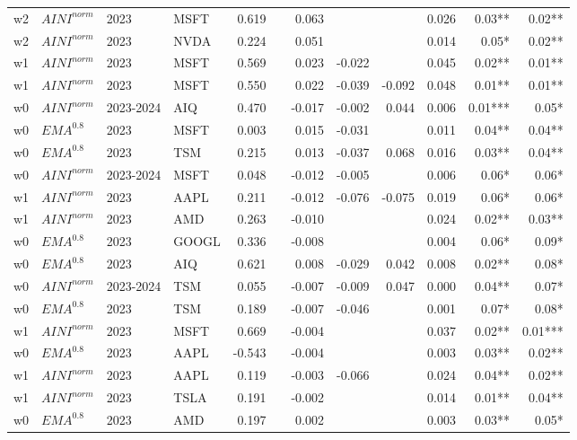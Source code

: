 {\begin{tabularx}{\textwidth}{@{}X@{\hspace{0.5pt}}X@{\hspace{0.5pt}}X@{\hspace{0.5pt}}X@{\hspace{2.0pt}} r r r r r r r r@{}}
w2 & $AINI^{norm}$ & 2023 & MSFT & 0.619 &  & 0.063 &  &  & 0.026 & 0.03** & 0.02** \\
w2 & $AINI^{norm}$ & 2023 & NVDA & 0.224 &  & 0.051 &  &  & 0.014 & 0.05* & 0.02** \\
w1 & $AINI^{norm}$ & 2023 & MSFT & 0.569 &  & 0.023 & -0.022 &  & 0.045 & 0.02** & 0.01** \\
w1 & $AINI^{norm}$ & 2023 & MSFT & 0.550 &  & 0.022 & -0.039 & -0.092 & 0.048 & 0.01** & 0.01** \\
w0 & $AINI^{norm}$ & 2023-2024 & AIQ & 0.470 &  & -0.017 & -0.002 & 0.044 & 0.006 & 0.01*** & 0.05* \\
w0 & $EMA^{0.8}$ & 2023 & MSFT & 0.003 &  & 0.015 & -0.031 &  & 0.011 & 0.04** & 0.04** \\
w0 & $EMA^{0.8}$ & 2023 & TSM & 0.215 &  & 0.013 & -0.037 & 0.068 & 0.016 & 0.03** & 0.04** \\
w0 & $AINI^{norm}$ & 2023-2024 & MSFT & 0.048 &  & -0.012 & -0.005 &  & 0.006 & 0.06* & 0.06* \\
w1 & $AINI^{norm}$ & 2023 & AAPL & 0.211 &  & -0.012 & -0.076 & -0.075 & 0.019 & 0.06* & 0.06* \\
w1 & $AINI^{norm}$ & 2023 & AMD & 0.263 &  & -0.010 &  &  & 0.024 & 0.02** & 0.03** \\
w0 & $EMA^{0.8}$ & 2023 & GOOGL & 0.336 &  & -0.008 &  &  & 0.004 & 0.06* & 0.09* \\
w0 & $EMA^{0.8}$ & 2023 & AIQ & 0.621 &  & 0.008 & -0.029 & 0.042 & 0.008 & 0.02** & 0.08* \\
w0 & $AINI^{norm}$ & 2023-2024 & TSM & 0.055 &  & -0.007 & -0.009 & 0.047 & 0.000 & 0.04** & 0.07* \\
w0 & $EMA^{0.8}$ & 2023 & TSM & 0.189 &  & -0.007 & -0.046 &  & 0.001 & 0.07* & 0.08* \\
w1 & $AINI^{norm}$ & 2023 & MSFT & 0.669 &  & -0.004 &  &  & 0.037 & 0.02** & 0.01*** \\
w0 & $EMA^{0.8}$ & 2023 & AAPL & -0.543 &  & -0.004 &  &  & 0.003 & 0.03** & 0.02** \\
w1 & $AINI^{norm}$ & 2023 & AAPL & 0.119 &  & -0.003 & -0.066 &  & 0.024 & 0.04** & 0.02** \\
w1 & $AINI^{norm}$ & 2023 & TSLA & 0.191 &  & -0.002 &  &  & 0.014 & 0.01** & 0.04** \\
w0 & $EMA^{0.8}$ & 2023 & AMD & 0.197 &  & 0.002 &  &  & 0.003 & 0.03** & 0.05* \\
\end{tabularx}
}
